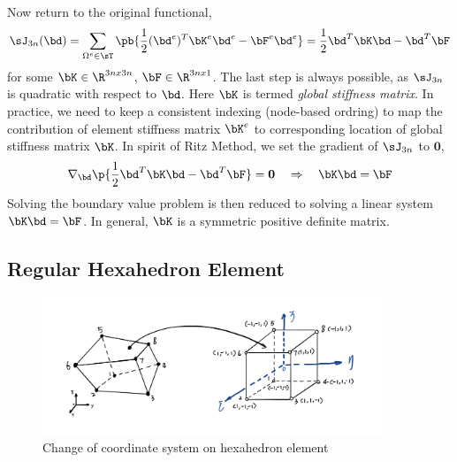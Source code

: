 \documentclass[11pt,titlepage]{article}
\begin{document}
Now return to the original functional,
\[
    \sJ_{3n}(\bd) = 
        \sum_{\Omega^e \in \sT} \pb{
            \frac{1}{2} (\bd^e)^T \bK^e \bd^e
                - \bF^e \bd^e
        }
        =
        \frac{1}{2} \bd^T \bK \bd - \bd^T \bF
\]
for some $\bK\in\R^{3nx3n}$, $\bF\in\R^{3nx1}$. The last step is always possible, as $\sJ_{3n}$ is quadratic with respect to $\bd$. Here $\bK$ is termed \textit{global stiffness matrix}. In practice, we need to keep a consistent indexing (node-based ordring) to map the contribution of element stiffness matrix $\bK^e$ to corresponding location of global stiffness matrix $\bK$. In spirit of Ritz Method, we set the gradient of $\sJ_{3n}$ to $\mathbf{0}$,
\[
    \nabla_{\bd} \p{\frac{1}{2} \bd^T \bK \bd - \bd^T \bF} = \mathbf{0}
    \quad\Rightarrow\quad
    \bK \bd = \bF
\]
Solving the boundary value problem is then reduced to solving a linear system $\bK \bd = \bF$. In general, $\bK$ is a symmetric positive definite matrix.


\subsection{Regular Hexahedron Element}

\begin{figure}[!htbp]
    \begin{center}
        \includegraphics[width=4in]{screenshots/hex_element_cov}
        \caption{Change of coordinate system on hexahedron element}
    \end{center}
\end{figure}
\end{document}
